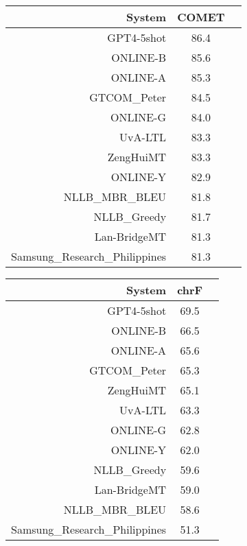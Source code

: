 \documentclass[11pt]{article}
\begin{document}
\begin{table}  
\scriptsize
\begin{subtable}[t]{0.33\textwidth}
\begin{tabular}{rcc}
\toprule 
System  & COMET \\ 
\midrule 
\rowcolor{ashgrey} GPT4-5shot  & 86.4 \\ 
\rowcolor{ashgrey} ONLINE-B  & 85.6 \\ 
\rowcolor{ashgrey} ONLINE-A  & 85.3 \\ 
\rowcolor{ashgrey} GTCOM\_Peter  & 84.5 \\ 
\rowcolor{ashgrey} ONLINE-G  & 84.0 \\ 
UvA-LTL  & 83.3 \\ 
\rowcolor{ashgrey} ZengHuiMT  & 83.3 \\ 
\rowcolor{ashgrey} ONLINE-Y  & 82.9 \\ 
\rowcolor{ashgrey} NLLB\_MBR\_BLEU  & 81.8 \\ 
\rowcolor{ashgrey} NLLB\_Greedy  & 81.7 \\ 
\rowcolor{ashgrey} Lan-BridgeMT  & 81.3 \\ 
Samsung\_Research\_Philippines  & 81.3 \\ 
\bottomrule 
\end{tabular} 
\end{subtable} 
\begin{subtable}[t]{0.33\textwidth}
\begin{tabular}{rcc}
\toprule 
System & chrF \\ 
\midrule 
\rowcolor{ashgrey} GPT4-5shot  & 69.5 \\ 
\rowcolor{ashgrey} ONLINE-B  & 66.5 \\ 
\rowcolor{ashgrey} ONLINE-A  & 65.6 \\ 
\rowcolor{ashgrey} GTCOM\_Peter & 65.3 \\ 
\rowcolor{ashgrey} ZengHuiMT  & 65.1 \\ 
UvA-LTL  & 63.3 \\ 
\rowcolor{ashgrey} ONLINE-G  & 62.8 \\ 
\rowcolor{ashgrey} ONLINE-Y  & 62.0 \\ 
\rowcolor{ashgrey} NLLB\_Greedy  & 59.6 \\ 
\rowcolor{ashgrey} Lan-BridgeMT  & 59.0 \\ 
\rowcolor{ashgrey} NLLB\_MBR\_BLEU  & 58.6 \\ 
Samsung\_Research\_Philippines   & 51.3 \\ 
\bottomrule 

\end{tabular}
\end{subtable}
\end{table}
\end{document}
